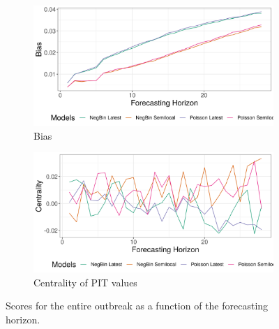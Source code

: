 \begin{figure}[H]
\begin{subfigure}{0.5\textwidth}
  \centering
  \includegraphics[width=\linewidth]{../output/Tchomia_bias.png}  
  \caption{Bias}
  \label{fig:sub-third}
\end{subfigure}
\begin{subfigure}{0.5\textwidth}
  \centering
  \includegraphics[width=\linewidth]{../output/Tchomia_centrality.png}  
  \caption{Centrality of PIT values}
  \label{fig:nat_scores_4}
\end{subfigure}
  \caption{Scores for the entire outbreak as a function of the forecasting horizon.}

  \label{fig:nat_scores}
\end{figure}
